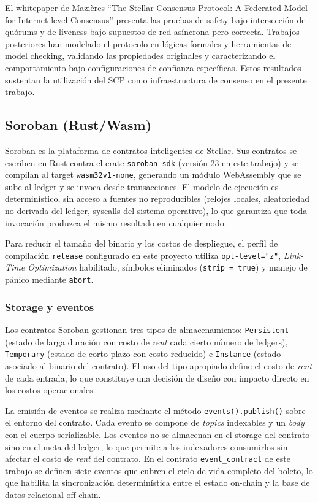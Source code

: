 El whitepaper de Mazières ``The Stellar Consensus Protocol: A Federated Model for Internet-level Consensus'' presenta las pruebas de safety bajo intersección de quórums y de liveness bajo supuestos de red asíncrona pero correcta. Trabajos posteriores han modelado el protocolo en lógicas formales y herramientas de model checking, validando las propiedades originales y caracterizando el comportamiento bajo configuraciones de confianza específicas. Estos resultados sustentan la utilización del SCP como infraestructura de consenso en el presente trabajo.

\subsection{Soroban (Rust/Wasm)}

Soroban es la plataforma de contratos inteligentes de Stellar. Sus contratos se escriben en Rust contra el crate \texttt{soroban-sdk} (versión 23 en este trabajo) y se compilan al target \texttt{wasm32v1-none}, generando un módulo WebAssembly que se sube al ledger y se invoca desde transacciones. El modelo de ejecución es determinístico, sin acceso a fuentes no reproducibles (relojes locales, aleatoriedad no derivada del ledger, syscalls del sistema operativo), lo que garantiza que toda invocación produzca el mismo resultado en cualquier nodo.

Para reducir el tamaño del binario y los costos de despliegue, el perfil de compilación \texttt{release} configurado en este proyecto utiliza \texttt{opt-level="z"}, \textit{Link-Time Optimization} habilitado, símbolos eliminados (\texttt{strip = true}) y manejo de pánico mediante \texttt{abort}.

\subsubsection{Storage y eventos}

Los contratos Soroban gestionan tres tipos de almacenamiento: \texttt{Persistent} (estado de larga duración con costo de \textit{rent} cada cierto número de ledgers), \texttt{Temporary} (estado de corto plazo con costo reducido) e \texttt{Instance} (estado asociado al binario del contrato). El uso del tipo apropiado define el costo de \textit{rent} de cada entrada, lo que constituye una decisión de diseño con impacto directo en los costos operacionales.

La emisión de eventos se realiza mediante el método \texttt{events().publish()} sobre el entorno del contrato. Cada evento se compone de \textit{topics} indexables y un \textit{body} con el cuerpo serializable. Los eventos no se almacenan en el storage del contrato sino en el meta del ledger, lo que permite a los indexadores consumirlos sin afectar el costo de \textit{rent} del contrato. En el contrato \texttt{event\_contract} de este trabajo se definen siete eventos que cubren el ciclo de vida completo del boleto, lo que habilita la sincronización determinística entre el estado on-chain y la base de datos relacional off-chain.

